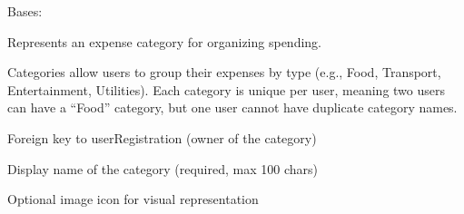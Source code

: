 \documentclass[letterpaper,10pt,english]{sphinxmanual}
\begin{document}

\begin{fulllineitems}
\label{\detokenize{expensesApp:expensesApp.models.Category}}
\pysigstartsignatures
\pysiglinewithargsret
{}
{\sphinxparamcomma {}}
{}
\pysigstopsignatures
\sphinxAtStartPar
Bases: 

\sphinxAtStartPar
Represents an expense category for organizing spending.

\sphinxAtStartPar
Categories allow users to group their expenses by type (e.g., Food,
Transport, Entertainment, Utilities). Each category is unique per user,
meaning two users can have a “Food” category, but one user cannot have
duplicate category names.

\begin{fulllineitems}
\label{\detokenize{expensesApp:expensesApp.models.Category.user}}
\pysigstartsignatures
\pysigline
{}
\pysigstopsignatures
\sphinxAtStartPar
Foreign key to userRegistration (owner of the category)

\end{fulllineitems}


\begin{fulllineitems}
\label{\detokenize{expensesApp:expensesApp.models.Category.name}}
\pysigstartsignatures
\pysigline
{}
\pysigstopsignatures
\sphinxAtStartPar
Display name of the category (required, max 100 chars)

\end{fulllineitems}


\begin{fulllineitems}
\label{\detokenize{expensesApp:expensesApp.models.Category.icon}}
\pysigstartsignatures
\pysigline
{}
\pysigstopsignatures
\sphinxAtStartPar
Optional image icon for visual representation


\end{fulllineitems}
\end{fulllineitems}
\end{document}
